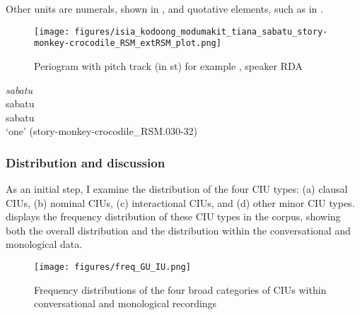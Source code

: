 Other units are numerals, shown in  , and quotative elements, such as in . 


\begin{figure}
	\texttt{[image: figures/isia\_kodoong\_modumakit\_tiana\_sabatu\_story-monkey-crocodile\_RSM\_extRSM\_plot.png]}
	\caption{Periogram with pitch track (in st) for example , speaker RDA}
	\label{pitch:nums and QUOTs}
\end{figure}



\ea
\label{ex:nums and QUOTs}



{
	\ex
	\label{ex:sabatu}
	\textit{sabatu} \\
	\gll  sabatu\\
	sabatu \\
	\glt `one'
	\hfill(story-monkey-crocodile\_RSM.030-32)
}
\z
\z



\subsubsection{Distribution and discussion}\label{sec:distribution-of-main-iu-types}


As an initial step, I examine the distribution of the four CIU types: (a) clausal CIUs, (b) nominal CIUs, (c) interactional CIUs, and (d) other minor CIU types.     displays the frequency distribution of these CIU types in the corpus, showing both the overall distribution and the distribution within the conversational and monological data.


\begin{figure}
	\texttt{[image: figures/freq\_GU\_IU.png]}
	\caption{Frequency distributions of the four broad categories of CIUs within conversational and monological recordings}
	\label{Freq_GU_IP_type}
\end{figure}



